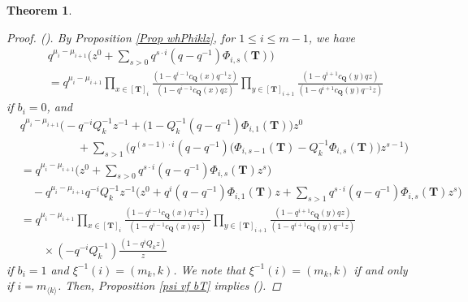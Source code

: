 \documentclass[12pt]{amsart}
\newtheorem{thm}{Theorem}[section]
\numberwithin{equation}{thm}
\newcommand\bQ{\mathbf Q}
\newcommand\bT{\mathbf T}
\newcommand\lan{\langle}
\newcommand\ran{\rangle}
\newcounter{ichi}
\newcommand{\roi}{\roman{ichi}}
\begin{document}
\begin{thm}
\begin{proof}
(\roi). 
By Proposition \ref{Prop whPhiklz}, 
for $1 \leq i \leq m-1$, 
we have 
\begin{align*}
&q^{\mu_i - \mu_{i+1}} \big( z^0 + \sum_{s>0} q^{s \cdot i} (q-q^{-1}) \Phi_{i,s} (\bT) \big) 
\\
&= q^{\mu_i - \mu_{i+1}} \prod_{x \in [\bT]_i} \frac{(1 - q^{i-1} c_{\bQ}(x) q^{-1} z)}{ (1 - q^{i-1} c_{\bQ} (x) q z)} 
	\prod_{y \in [\bT]_{i+1}} \frac{ (1 - q^{i+1} c_{\bQ} (y) q z ) }{ (1 - q^{i+1} c_{\bQ} (y) q^{-1} z)}  
\end{align*}
if $b_i=0$, and 
\begin{align*}
& q^{\mu_i - \mu_{i+1}} \Big( - q^{-i} Q_k^{-1} z^{-1} + \big( 1 - Q_k^{-1} (q-q^{-1}) \Phi_{i,1} (\bT) \big) z^0 
	\\ & \hspace{5em} 
	+ \sum_{s >1} \Big( q^{(s-1) \cdot i} (q-q^{-1}) \big( \Phi_{i,s-1} (\bT) - Q_k^{-1} \Phi_{i,s} (\bT) \big) z^{s-1} \Big) 
\\
&= q^{\mu_i - \mu_{i+1}} \big( z^0 + \sum_{s >0} q^{ s \cdot i} (q-q^{-1}) \Phi_{i,s} (\bT) z^s \big) 
	\\ & \quad 
	- q^{\mu_i -\mu_{i+1}} q^{-i} Q_k^{-1} z^{-1} 
		\big( z^0 + q^i(q-q^{-1}) \Phi_{i,1} (\bT) z + \sum_{s >1} q^{s \cdot i } (q-q^{-1}) \Phi_{i,s} (\bT) z^s \big) 
\\
&= q^{\mu_i - \mu_{i+1}} \prod_{x \in [\bT]_i} \frac{(1 - q^{i-1} c_{\bQ}(x) q^{-1} z)}{ (1 - q^{i-1} c_{\bQ} (x) q z)} 
	\prod_{y \in [\bT]_{i+1}} \frac{ (1 - q^{i+1} c_{\bQ} (y) q z ) }{ (1 - q^{i+1} c_{\bQ} (y) q^{-1} z)}  
	\\ & \qquad \times 
	 (- q^{-i} Q_k^{-1}) \frac{(1 - q^i Q_k z)}{z}
\end{align*}
if $b_i=1$ and $\xi^{-1} (i)=(m_k,k)$. 
We note that $\xi^{-1}(i) = (m_k,k)$ if and only if $i=m_{\lan k \ran}$. 
Then, Proposition \ref{psi vf bT} implies (\roi). 



\end{proof}
\end{thm}
\end{document}
